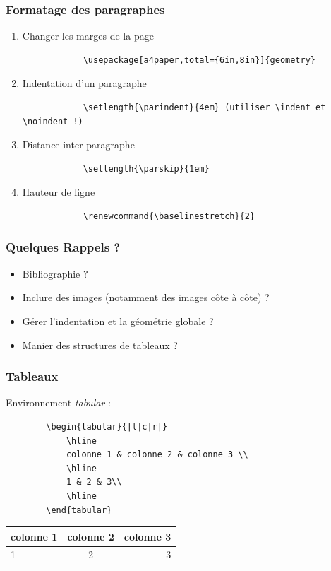 \documentclass[handout]{beamer}
\begin{document}
\begin{frame}[fragile=singleslide]
	\frametitle{Formatage des paragraphes}

	\begin{enumerate}
		\item Changer les marges  de la page\\

			\begin{verbatim}
			\usepackage[a4paper,total={6in,8in}]{geometry}
			\end{verbatim}
		\item Indentation d'un paragraphe\\

			\begin{verbatim}
			\setlength{\parindent}{4em} (utiliser \indent et \noindent !)
			\end{verbatim}
		\item Distance inter-paragraphe\\

			\begin{verbatim}
			\setlength{\parskip}{1em}
			\end{verbatim}
		\item Hauteur de ligne\\
			\begin{verbatim}
			\renewcommand{\baselinestretch}{2}
			\end{verbatim}
	\end{enumerate}
\end{frame}

\begin{frame}
	\frametitle{Quelques Rappels ?}
	\begin{itemize}
		\item Bibliographie ?
		\item Inclure des images (notamment des images côte à côte) ?
		\item Gérer l'indentation et la géométrie globale ?
		\item Manier des structures de tableaux ?
	\end{itemize}
\end{frame}

\begin{frame}[fragile=singleslide]
	\frametitle{Tableaux}
	\centering
	Environnement \textit{tabular} :
	\begin{verbatim}
		\begin{tabular}{|l|c|r|}
			\hline
			colonne 1 & colonne 2 & colonne 3 \\
			\hline
			1 & 2 & 3\\
			\hline
		\end{tabular}
	\end{verbatim}

	\begin{tabular}{|l|c|r|}
		\hline
		colonne 1 & colonne 2 & colonne 3 \\
		\hline
		1 & 2 & 3\\
		\hline
	\end{tabular}

\end{frame}
\end{document}
